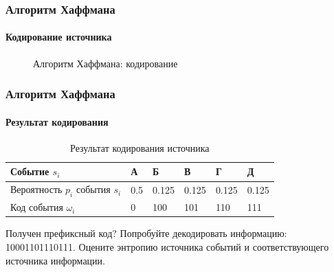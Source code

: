 \begin{frame}
\frametitle{Алгоритм Хаффмана}
\framesubtitle{Кодирование источника}
\begin{figure}
    \begin{center}
    \end{center}
    \caption{Алгоритм Хаффмана: кодирование}\label{pict:huffman}
\end{figure} 
\end{frame}


\begin{frame}
\frametitle{Алгоритм Хаффмана}
\framesubtitle{Результат кодирования}
\begin{example}
    \begin{table}[ht]
    \caption{Результат кодирования источника}
    \label{t:haffStatSourceResult}
    \centering
    \begin{tabular}[c]{|l|l|l|l|l|l|}
        \hline
        Событие $s_i$                       &А      &Б      &В      &Г      &Д     \\ \hline
        Вероятность $p_i$ события $s_i$     &0.5    &0.125  &0.125  &0.125  &0.125 \\ \hline\hline
        Код события $\omega_i$              &0      &100    &101    &110    &111   \\ \hline
    \end{tabular}
    \end{table}
\end{example}
Получен префиксный код? Попробуйте декодировать информацию: 10001101110111. Оцените энтропию источника событий и соответствующего источника информации.
\end{frame}


